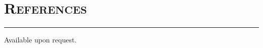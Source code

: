 \documentclass{article}
\newcommand{\HRule}{\rule{\linewidth}{0.5mm}}
\begin{document}

\section*{\bf \textsc{References}}
\vspace{-5mm}\HRule
\vspace{1em}
Available upon request.

\bigskip
\end{document}
